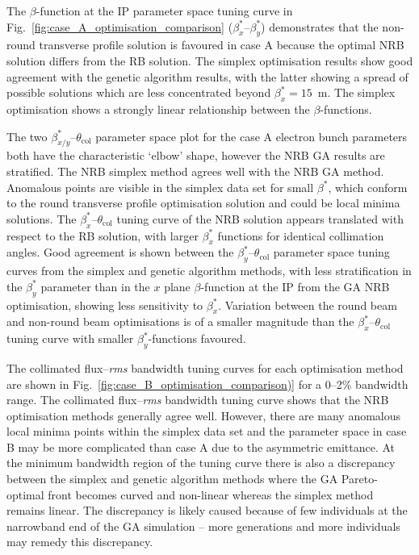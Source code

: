\documentclass[../main.tex]{subfiles}
\begin{document}
The $\beta$-function at the IP parameter space tuning curve in Fig.~\ref{fig:case_A_optimisation_comparison} ($\beta_{x}^{*}$--$\beta_{y}^{*}$) demonstrates that the non-round transverse profile solution is favoured in case A because the optimal NRB solution differs from the RB solution. The simplex optimisation results show good agreement with the genetic algorithm results, with the latter showing a spread of possible solutions which are less concentrated beyond $\beta_{x}^{*} = 15$~\si{\meter}. The simplex optimisation shows a strongly linear relationship between the $\beta$-functions. 

The two $\beta_{x/y}^{*}$--$\theta_{\mathrm{col}}$ parameter space plot for the case A electron bunch parameters both have the characteristic `elbow' shape, however the NRB GA results are stratified. The NRB simplex method agrees well with the NRB GA method. Anomalous points are visible in the simplex data set for small $\beta^{*}$, which conform to the round transverse profile optimisation solution and could be local minima solutions. The $\beta_{x}^{*}$--$\theta_{\mathrm{col}}$ tuning curve of the NRB solution appears translated with respect to the RB solution, with larger $\beta_{x}^{*}$ functions for identical collimation angles. Good agreement is shown between the $\beta_{y}^{*}$--$\theta_{\mathrm{col}}$ parameter space tuning curves from the simplex and genetic algorithm methods, with less stratification in the $\beta_{y}^{*}$ parameter than in the $x$ plane $\beta$-function at the IP from the GA NRB optimisation, showing less sensitivity to $\beta_{x}^{*}$. Variation between the round beam and non-round beam optimisations is of a smaller magnitude than the $\beta_{x}^{*}$--$\theta_{\mathrm{col}}$ tuning curve with smaller $\beta_{y}^{*}$-functions favoured.   


The collimated flux--\textit{rms} bandwidth tuning curves for each optimisation method are shown in Fig.~\ref{fig:case_B_optimisation_comparison)} for a 0--2\% bandwidth range. The collimated flux--\textit{rms} bandwidth tuning curve shows that the NRB optimisation methods generally agree well. However, there are many anomalous local minima points within the simplex data set and the parameter space in case B may be more complicated than case A due to the asymmetric emittance. At the minimum bandwidth region of the tuning curve there is also a discrepancy between the simplex and genetic algorithm methods where the GA Pareto-optimal front becomes curved and non-linear whereas the simplex method remains linear. The discrepancy is likely caused because of few individuals at the narrowband end of the GA simulation -- more generations and more individuals may remedy this discrepancy.
\end{document}
